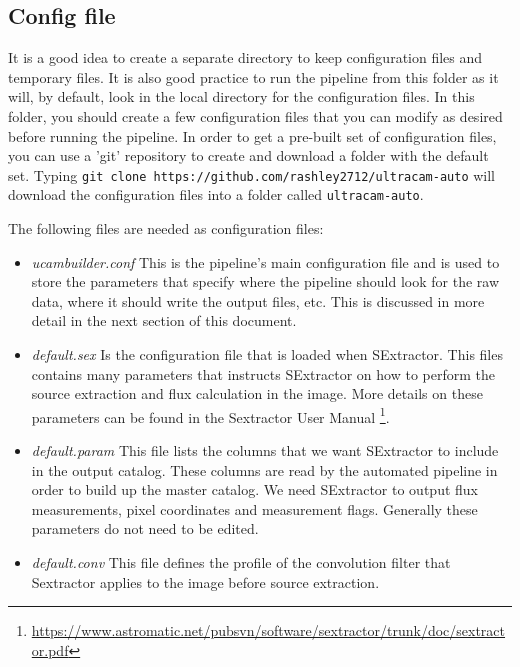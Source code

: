 \subsection{Config file}
It is a good idea to create a separate directory to keep configuration files and temporary files. It is also good practice to run the pipeline from this folder as it will, by default, look in the local directory for the configuration files. In this folder, you should create a few configuration files that you can modify as desired before running the pipeline. In order to get a pre-built set of configuration files, you can use a 'git' repository to create and download a folder with the default set. Typing \texttt{git clone https://github.com/rashley2712/ultracam-auto} will download the configuration files into a folder called \texttt{ultracam-auto}. 

The following files are needed as configuration files: 
\begin{itemize}
  \item \emph{ucambuilder.conf} This is the pipeline's main configuration file and is used to store the parameters that specify where the pipeline should look for the raw data, where it should write the output files, etc. This is discussed in more detail in the next section of this document. 
  \item \emph{default.sex} Is the configuration file that is loaded when {SExtractor}.  This files contains many parameters that instructs {SExtractor} on how to perform the source extraction and flux calculation in the image. More details on these parameters can be found in the {Sextractor} User Manual \footnote{\url{https://www.astromatic.net/pubsvn/software/sextractor/trunk/doc/sextractor.pdf}}. 
  \item \emph{default.param} This file lists the columns that we want {SExtractor} to include in the output catalog. These columns are read by the automated pipeline in order to build up the master catalog. We need {SExtractor} to output flux measurements, pixel coordinates and measurement flags. Generally these parameters do not need to be edited. 
  \item \emph{default.conv} This file defines the profile of the convolution filter that {Sextractor} applies to the image before source extraction. 
\end{itemize}

